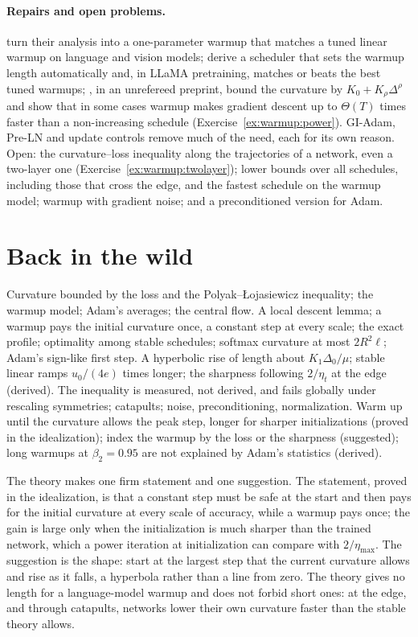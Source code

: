 \begin{refsection}
\paragraph{Repairs and open problems.} \Textcite{AlimisisIslamovLucchi2026} turn their analysis into a one-parameter warmup that matches a tuned linear warmup on language and vision models; \textcite{RiabininEtAl2026} derive a scheduler that sets the warmup length automatically and, in LLaMA pretraining, matches or beats the best tuned warmups; \textcite{LiuEtAl2025Warmup}, in an unrefereed preprint, bound the curvature by $K_0+K_\rho\Delta^\rho$ and show that in some cases warmup makes gradient descent up to $\Theta(T)$ times faster than a non-increasing schedule (Exercise~\ref{ex:warmup:power}). GI-Adam, Pre-LN and update controls remove much of the need, each for its own reason. Open: the curvature--loss inequality along the trajectories of a network, even a two-layer one (Exercise~\ref{ex:warmup:twolayer}); lower bounds over all schedules, including those that cross the edge, and the fastest schedule on the warmup model; warmup with gradient noise; and a preconditioned version for Adam.

\section{Back in the wild}\label{sec:warmup:back}

{Curvature bounded by the loss and the Polyak--Łojasiewicz inequality; the warmup model; Adam's averages; the central flow.}
{A local descent lemma; a warmup pays the initial curvature once, a constant step at every scale; the exact profile; optimality among stable schedules; softmax curvature at most $2R^2\ell$; Adam's sign-like first step.}
{A hyperbolic rise of length about $K_1\Delta_0/\mu$; stable linear ramps $u_0/(4e)$ times longer; the sharpness following $2/\eta_t$ at the edge (derived).}
{The inequality is measured, not derived, and fails globally under rescaling symmetries; catapults; noise, preconditioning, normalization.}
{Warm up until the curvature allows the peak step, longer for sharper initializations (proved in the idealization); index the warmup by the loss or the sharpness (suggested); long warmups at $\beta_2=0.95$ are not explained by Adam's statistics (derived).}

The theory makes one firm statement and one suggestion. The statement, proved in the idealization, is that a constant step must be safe at the start and then pays for the initial curvature at every scale of accuracy, while a warmup pays once; the gain is large only when the initialization is much sharper than the trained network, which a power iteration at initialization can compare with $2/\eta_{\max}$. The suggestion is the shape: start at the largest step that the current curvature allows and rise as it falls, a hyperbola rather than a line from zero. The theory gives no length for a language-model warmup and does not forbid short ones: at the edge, and through catapults, networks lower their own curvature faster than the stable theory allows.


\end{refsection}

